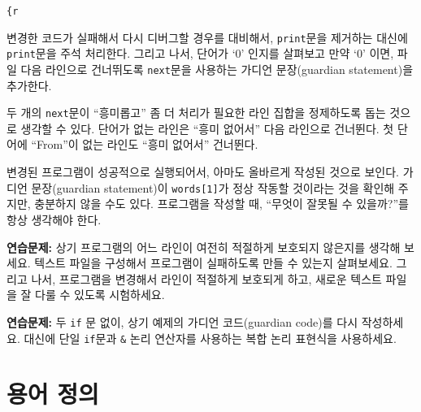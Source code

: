 \documentclass[
  letterpaper,
]{book}
\begin{document}
\texttt{\{r}

변경한 코드가 실패해서 다시 디버그할 경우를 대비해서, \texttt{print}문을
제거하는 대신에 \texttt{print}문을 주석 처리한다. 그리고 나서, 단어가
`0' 인지를 살펴보고 만약 `0' 이면, 파일 다음 라인으로 건너뛰도록
\texttt{next}문을 사용하는 가디언 문장(guardian statement)을 추가한다.

두 개의 \texttt{next}문이 ``흥미롭고'' 좀 더 처리가 필요한 라인 집합을
정제하도록 돕는 것으로 생각할 수 있다. 단어가 없는 라인은 ``흥미
없어서'' 다음 라인으로 건너뛴다. 첫 단어에 ``From''이 없는 라인도 ``흥미
없어서'' 건너뛴다.

변경된 프로그램이 성공적으로 실행되어서, 아마도 올바르게 작성된 것으로
보인다. 가디언 문장(guardian statement)이 \texttt{words{[}1{]}}가 정상
작동할 것이라는 것을 확인해 주지만, 충분하지 않을 수도 있다. 프로그램을
작성할 때, ``무엇이 잘못될 수 있을까?''를 항상 생각해야 한다.

\textbf{연습문제:} 상기 프로그램의 어느 라인이 여전히 적절하게 보호되지
않은지를 생각해 보세요. 텍스트 파일을 구성해서 프로그램이 실패하도록
만들 수 있는지 살펴보세요. 그리고 나서, 프로그램을 변경해서 라인이
적절하게 보호되게 하고, 새로운 텍스트 파일을 잘 다룰 수 있도록
시험하세요.

\textbf{연습문제:} 두 \texttt{if} 문 없이, 상기 예제의 가디언
코드(guardian code)를 다시 작성하세요. 대신에 단일 \texttt{if}문과
\texttt{\&} 논리 연산자를 사용하는 복합 논리 표현식을 사용하세요.

\section{용어 정의}\label{r-list-terminology}
\end{document}

